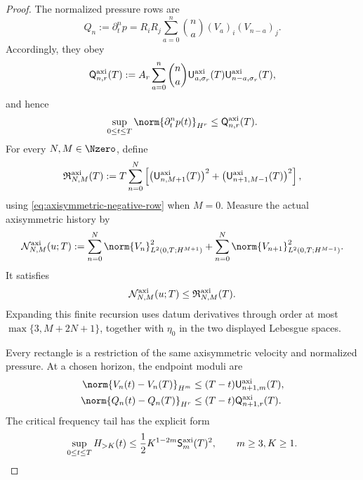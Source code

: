 \begin{proof}
The normalized pressure rows are
\begin{equation}
 Q_n:=\partial_t^np
 =R_iR_j\sum_{a=0}^{n}\binom na
  (V_a)_i(V_{n-a})_j.
 \label{eq:axisymmetric-pressure-formula}
\end{equation}
Accordingly, they obey
\begin{equation}
 \mathsf Q_{n,r}^{\rm axi}(T)
 :=A_r\sum_{a=0}^{n}\binom na
 \mathsf U_{a,\sigma_r}^{\rm axi}(T)
 \mathsf U_{n-a,\sigma_r}^{\rm axi}(T),
 \label{eq:axisymmetric-pressure-envelope}
\end{equation}
and hence
\begin{equation}
 \sup_{0\le t\le T}\norm{\partial_t^np(t)}_{H^r}
 \le\mathsf Q_{n,r}^{\rm axi}(T).
 \label{eq:axisymmetric-pressure-bound}
\end{equation}
For every \(N,M\in\Nzero\), define
\begin{equation}
 \mathfrak R_{N,M}^{\rm axi}(T)
 :=T\sum_{n=0}^{N}\left[
  \bigl(\mathsf U_{n,M+1}^{\rm axi}(T)\bigr)^2
  +\bigl(\mathsf U_{n+1,M-1}^{\rm axi}(T)\bigr)^2
 \right],
 \label{eq:axisymmetric-rectangle-envelope}
\end{equation}
using \eqref{eq:axisymmetric-negative-row} when \(M=0\).  Measure the actual
axisymmetric history by
\[
 \mathcal N_{N,M}^{\rm axi}(u;T)
 :=\sum_{n=0}^{N}\norm{V_n}_{L^2(0,T;H^{M+1})}^2
   +\sum_{n=0}^{N}\norm{V_{n+1}}_{L^2(0,T;H^{M-1})}^2.
\]
It satisfies
\begin{equation}
 \mathcal N_{N,M}^{\rm axi}(u;T)
 \le\mathfrak R_{N,M}^{\rm axi}(T).
 \label{eq:axisymmetric-rectangle-bound}
\end{equation}
Expanding this finite recursion uses datum derivatives through order at most
\(\max\{3,M+2N+1\}\), together with \(\eta_0\) in the two displayed
Lebesgue spaces.

Every rectangle is a restriction of the same axisymmetric velocity and
normalized pressure.  At a chosen horizon, the endpoint moduli are
\begin{align}
 \norm{V_n(t)-V_n(T)}_{H^m}
 &\le(T-t)\mathsf U_{n+1,m}^{\rm axi}(T),
 \label{eq:axisymmetric-endpoint-modulus}\\
 \norm{Q_n(t)-Q_n(T)}_{H^r}
 &\le(T-t)\mathsf Q_{n+1,r}^{\rm axi}(T).
 \label{eq:axisymmetric-pressure-modulus}
\end{align}
The critical frequency tail has the explicit form
\begin{equation}
 \sup_{0\le t\le T}H_{>K}(t)
 \le\frac12K^{1-2m}\mathsf S_m^{\rm axi}(T)^2,
 \qquad m\ge3, K\ge1.
 \label{eq:axisymmetric-tail}
\end{equation}


\end{proof}
